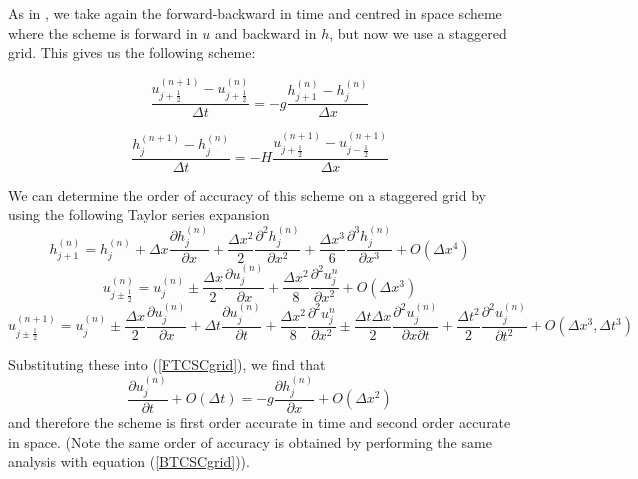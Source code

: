\documentclass[a4paper, 10.5pt, notitlepage]{article}
\begin{document}
As in \cite{MPE textbook}, we take again the forward-backward in time and centred in space scheme where the scheme is forward in $u$ and backward in $h$, but now we use a staggered grid. This gives us the following scheme:

\begin{equation}\label{FTCSCgrid}
\frac{u_{j+ \frac{1}{2}}^{(n+1)} - u_{j + \frac{1}{2}}^{(n)}}{\Delta t} = -g \frac{h_{j+1}^{(n)} - h_{j}^{(n)}}{\Delta x}
\end{equation}

\begin{equation}\label{BTCSCgrid}
\frac{h_{j}^{(n+1)} - h_{j}^{(n)}}{\Delta t} = -H \frac{u_{j+\frac{1}{2}}^{(n+1)} - u_{j-\frac{1}{2}}^{(n+1)}}{\Delta x}
\end{equation}


We can determine the order of accuracy of this scheme on a staggered grid by using the following Taylor series expansion 
\begin{equation}
h_{j + 1}^{(n)} = h_{j}^{(n)} + \Delta x  \frac{\partial h_{j}^{(n)}}{\partial x} + \frac{\Delta x^{2}}{2}\frac{\partial^{2} h_{j}^{(n)}}{\partial x^{2}} + \frac{\Delta x^{3}}{6}\frac{\partial^{3} h_{j}^{(n)}}{\partial x^{3}} + O(\Delta x^{4})
\end{equation}
\begin{equation} \label{uj+1/2n}
u_{j \pm \frac{1}{2}}^{(n)} = u_{j}^{(n)} \pm \frac{\Delta x}{2}\frac{\partial u_{j}^{(n)}}{\partial x} + \frac{\Delta x^{2}}{8}\frac{\partial^{2}u_{j}^{n}}{\partial x^{2}} + O(\Delta x^{3})
\end{equation}
\begin{equation} \label{uj+1/2n+1}
u_{j \pm \frac{1}{2}}^{(n + 1)} = u_{j}^{(n)} \pm \frac{\Delta x}{2}\frac{\partial u_{j}^{(n)}}{\partial x} + \Delta t \frac{\partial u_{j}^{(n)}}{\partial t} + \frac{\Delta x^{2}}{8}\frac{\partial^{2}u_{j}^{n}}{\partial x^{2}} \pm \frac{\Delta t \Delta x}{2}\frac{\partial^{2} u_{j}^{(n)}}{\partial x \partial t} + \frac{\Delta t^{2}}{2} \frac{\partial ^{2} u_{j}^{(n)}}{\partial t ^{2}} + O(\Delta x^{3}, \Delta t^{3})
\end{equation}

Substituting these into (\ref{FTCSCgrid}), we find that 
\begin{equation}
\frac{\partial u_{j}^{(n)}}{\partial t} + O(\Delta t) =  -g \frac{\partial h_{j}^{(n)}}{\partial x} + O(\Delta x^{2})
\end{equation} 
and therefore the scheme is first order accurate in time and second order accurate in space. (Note the same order of accuracy is obtained by performing the same analysis with equation (\ref{BTCSCgrid})).
\end{document}
